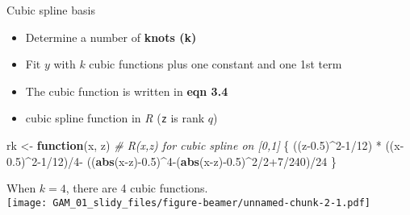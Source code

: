 \documentclass[14 pt,ignorenonframetext,]{beamer}
\newenvironment{Shaded}{}{}
\newcommand{\CommentTok}[1]{\textcolor[rgb]{0.38,0.63,0.69}{\textit{#1}}}
\newcommand{\ControlFlowTok}[1]{\textcolor[rgb]{0.00,0.44,0.13}{\textbf{#1}}}
\newcommand{\DecValTok}[1]{\textcolor[rgb]{0.25,0.63,0.44}{#1}}
\newcommand{\FloatTok}[1]{\textcolor[rgb]{0.25,0.63,0.44}{#1}}
\newcommand{\KeywordTok}[1]{\textcolor[rgb]{0.00,0.44,0.13}{\textbf{#1}}}
\newcommand{\NormalTok}[1]{#1}
\newcommand{\OperatorTok}[1]{\textcolor[rgb]{0.40,0.40,0.40}{#1}}
\newcommand{\StringTok}[1]{\textcolor[rgb]{0.25,0.44,0.63}{#1}}
\begin{document}
\begin{frame}[fragile]{Cubic spline basis}
\protect\hypertarget{cubic-spline-basis}{}

\begin{itemize}
\item
  Determine a number of \textbf{knots (k)}
\item
  Fit \(y\) with \(k\) cubic functions plus one constant and one 1st
  term
\item
  The cubic function is written in \textbf{eqn 3.4}
\item
  cubic spline function in \emph{R} (\texttt{z} is rank \(q\))
\end{itemize}

\begin{Shaded}
\begin{Highlighting}[]
\NormalTok{rk <-}\StringTok{ }\ControlFlowTok{function}\NormalTok{(x, z) }\CommentTok{# R(x,z) for cubic spline on [0,1] }
\NormalTok{  \{ }
\NormalTok{  ((z}\FloatTok{-0.5}\NormalTok{)}\OperatorTok{^}\DecValTok{2-1}\OperatorTok{/}\DecValTok{12}\NormalTok{) }\OperatorTok{*}\StringTok{ }\NormalTok{((x}\FloatTok{-0.5}\NormalTok{)}\OperatorTok{^}\DecValTok{2-1}\OperatorTok{/}\DecValTok{12}\NormalTok{)}\OperatorTok{/}\DecValTok{4}\OperatorTok{-}\StringTok{ }\NormalTok{((}\KeywordTok{abs}\NormalTok{(x}\OperatorTok{-}\NormalTok{z)}\OperatorTok{-}\FloatTok{0.5}\NormalTok{)}\OperatorTok{^}\DecValTok{4}\OperatorTok{-}\NormalTok{(}\KeywordTok{abs}\NormalTok{(x}\OperatorTok{-}\NormalTok{z)}\OperatorTok{-}\FloatTok{0.5}\NormalTok{)}\OperatorTok{^}\DecValTok{2}\OperatorTok{/}\DecValTok{2}\OperatorTok{+}\DecValTok{7}\OperatorTok{/}\DecValTok{240}\NormalTok{)}\OperatorTok{/}\DecValTok{24}
\NormalTok{\}}
\end{Highlighting}
\end{Shaded}

\end{frame}

\begin{frame}{}
\protect\hypertarget{section}{}

When \(k = 4\), there are 4 cubic functions.\\
\texttt{[image: GAM\_01\_slidy\_files/figure-beamer/unnamed-chunk-2-1.pdf]}

\end{frame}
\end{document}
